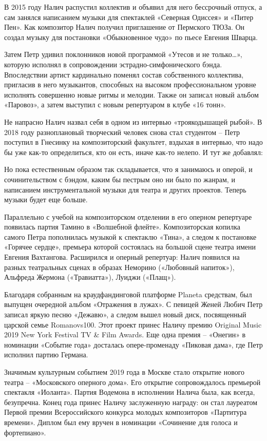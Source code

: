 В 2015 году Налич распустил коллектив и объявил для него бессрочный отпуск, а сам занялся написанием музыки для спектаклей «Северная Одиссея» и «Питер Пен». Как композитор Налич получил приглашение от Пермского ТЮЗа. Он создал музыку для постановки «Обыкновенное чудо» по пьесе Евгения Шварца.

Затем Петр удивил поклонников новой программой «Утесов и не только…», которую исполнял в сопровождении эстрадно-симфонического бэнда. Впоследствии артист кардинально поменял состав собственного коллектива, пригласив в него музыкантов, способных на высоком профессиональном уровне исполнять совершенно новые ритмы и мелодии. Также он записал новый альбом «Паровоз», а затем выступил с новым репертуаром в клубе «16 тонн».

Не напрасно Налич назвал себя в одном из интервью «троякодышащей рыбой». В 2018 году разноплановый творческий человек снова стал студентом – Петр поступил в Гнесинку на композиторский факультет, вздыхая в интервью, что надо бы уже как-то определиться, кто он есть, иначе как-то нелепо. И тут же добавлял:

\begin{fancyquotes}
    Но пока естественным образом так складывается, что я занимаюсь и оперой, и сочинительством с бэндом, каким бы пестрым оно ни было по жанрам, и написанием инструментальной музыки для театра и других проектов. Теперь музыки будет еще больше.
\end{fancyquotes}


Параллельно с учебой на композиторском отделении в его оперном репертуаре появилась партия Тамино в «Волшебной флейте». Композиторская копилка самого Петра пополнилась музыкой к спектаклю «Тина», а следом к постановке «Горячее сердце», премьера которой состоялась на большой сцене театра имени Евгения Вахтангова. Расширился и оперный репертуар: Налич появился на разных театральных сценах в образах Неморино («Любовный напиток»), Альфреда Жермона («Травиатта»), Луиджи («Плащ»).

Благодаря собранным на краудфандинговой платформе Planeta средствам, был выпущен очередной альбом «Отражения в лужах». С певицей Женей Любич Петр записал яркую песню «Дежавю», а следом вышел новый диск, посвященный царской семье Romanovs100. Этот проект принес Наличу премию Original Music 2019 New York Festival TV \& Film Awards. Еще одна премия – «Онегин» в номинации «Событие года» досталась опере-променаду «Пиковая дама», где Петр исполнил партию Германа.

Значимым культурным событием 2019 года в Москве стало открытие нового театра – «Московского оперного дома». Его открытие сопровождалось премьерой спектакля «Иоланта». Партия Водемона в исполнении Налича была, как всегда, безупречна. Конец года принес Наличу заслуженную награду: он стал лауреатом Первой премии Всероссийского конкурса молодых композиторов «Партитура времени». Диплом был ему вручен в номинации «Сочинение для голоса и фортепиано».



